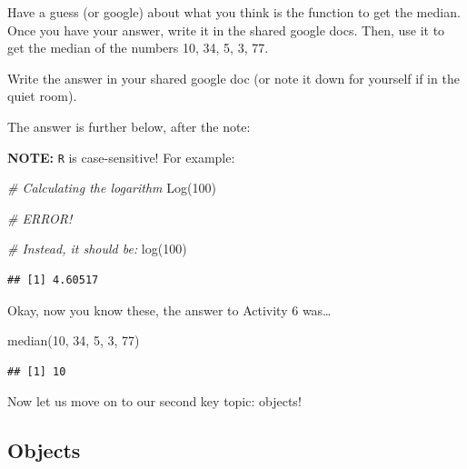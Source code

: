 \documentclass[
]{book}
\newenvironment{Shaded}{\begin{snugshade}}{\end{snugshade}}
\newcommand{\CommentTok}[1]{\textcolor[rgb]{0.56,0.35,0.01}{\textit{#1}}}
\newcommand{\DecValTok}[1]{\textcolor[rgb]{0.00,0.00,0.81}{#1}}
\newcommand{\FunctionTok}[1]{\textcolor[rgb]{0.00,0.00,0.00}{#1}}
\newcommand{\NormalTok}[1]{#1}
\begin{document}
Have a guess (or google) about what you think is the function to get the median. Once you have your answer, write it in the shared google docs. Then, use it to get the median of the numbers 10, 34, 5, 3, 77.

Write the answer in your shared google doc (or note it down for yourself if in the quiet room).

The answer is further below, after the note:

\textbf{NOTE:} \texttt{R} is case-sensitive! For example:

\begin{Shaded}
\begin{Highlighting}[]
\CommentTok{\# Calculating the logarithm }
\FunctionTok{Log}\NormalTok{(}\DecValTok{100}\NormalTok{)}

\CommentTok{\# ERROR!}
\end{Highlighting}
\end{Shaded}

\begin{Shaded}
\begin{Highlighting}[]
\CommentTok{\# Instead, it should be:}
\FunctionTok{log}\NormalTok{(}\DecValTok{100}\NormalTok{)}
\end{Highlighting}
\end{Shaded}

\begin{verbatim}
## [1] 4.60517
\end{verbatim}

Okay, now you know these, the answer to Activity 6 was\ldots{}

\begin{Shaded}
\begin{Highlighting}[]
\FunctionTok{median}\NormalTok{(}\DecValTok{10}\NormalTok{, }\DecValTok{34}\NormalTok{, }\DecValTok{5}\NormalTok{, }\DecValTok{3}\NormalTok{, }\DecValTok{77}\NormalTok{)}
\end{Highlighting}
\end{Shaded}

\begin{verbatim}
## [1] 10
\end{verbatim}

Now let us move on to our second key topic: objects!

\hypertarget{objects}{%
\subsection{Objects}\label{objects}}
\end{document}
